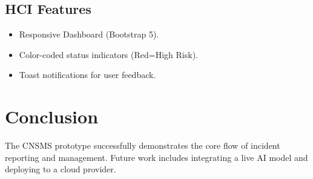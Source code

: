 \documentclass[a4paper,12pt]{article}
\begin{document}
\subsection{HCI Features}
\begin{itemize}
    \item Responsive Dashboard (Bootstrap 5).
    \item Color-coded status indicators (Red=High Risk).
    \item Toast notifications for user feedback.
\end{itemize}

\section{Conclusion}
The CNSMS prototype successfully demonstrates the core flow of incident reporting and management. Future work includes integrating a live AI model and deploying to a cloud provider.
\end{document}
